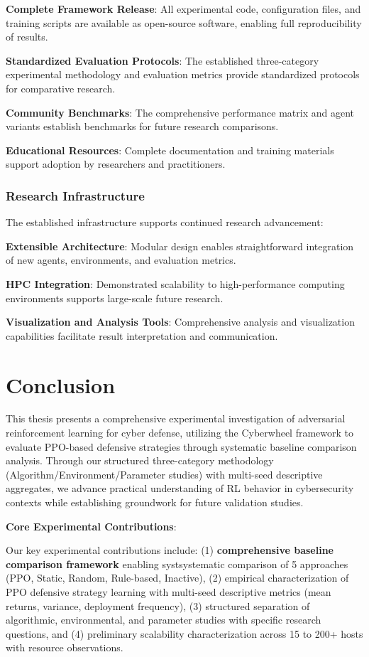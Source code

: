 \documentclass[12pt]{article}
\theoremstyle{definition}
\theoremstyle{plain}
\begin{document}
\textbf{Complete Framework Release}: All experimental code, configuration files, and training scripts are available as open-source software, enabling full reproducibility of results.

\textbf{Standardized Evaluation Protocols}: The established three-category experimental methodology and evaluation metrics provide standardized protocols for comparative research.

\textbf{Community Benchmarks}: The comprehensive performance matrix and agent variants establish benchmarks for future research comparisons.

\textbf{Educational Resources}: Complete documentation and training materials support adoption by researchers and practitioners.

\subsubsection{Research Infrastructure}
The established infrastructure supports continued research advancement:

\textbf{Extensible Architecture}: Modular design enables straightforward integration of new agents, environments, and evaluation metrics.

\textbf{HPC Integration}: Demonstrated scalability to high-performance computing environments supports large-scale future research.

\textbf{Visualization and Analysis Tools}: Comprehensive analysis and visualization capabilities facilitate result interpretation and communication.

\section{Conclusion}

This thesis presents a comprehensive experimental investigation of adversarial reinforcement learning for cyber defense, utilizing the Cyberwheel framework to evaluate PPO-based defensive strategies through systematic baseline comparison analysis. Through our structured three-category methodology (Algorithm/Environment/Parameter studies) with multi-seed descriptive aggregates, we advance practical understanding of RL behavior in cybersecurity contexts while establishing groundwork for future validation studies.

\textbf{Core Experimental Contributions}:

Our key experimental contributions include: (1) \textbf{comprehensive baseline comparison framework} enabling systsystematic comparison of 5 approaches (PPO, Static, Random, Rule-based, Inactive), (2) empirical characterization of PPO defensive strategy learning with multi-seed descriptive metrics (mean returns, variance, deployment frequency), (3) structured separation of algorithmic, environmental, and parameter studies with specific research questions, and (4) preliminary scalability characterization across 15 to 200+ hosts with resource observations.
\end{document}
